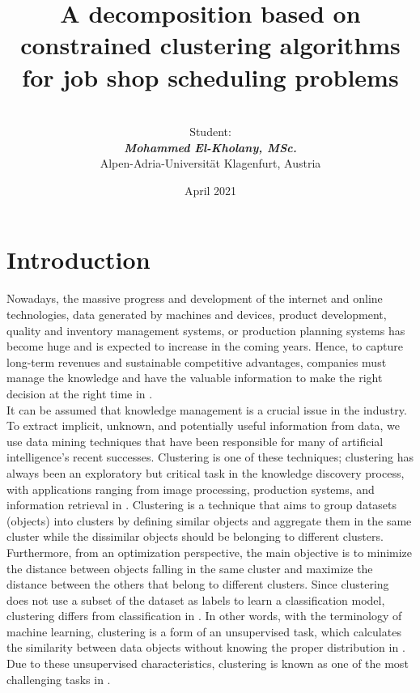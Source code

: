\documentclass{article}
\title{\textbf{A decomposition based on constrained clustering algorithms for job shop scheduling problems} \\}
\author{\\[1in] Student: \\ \textit{\textbf{Mohammed El-Kholany, MSc.}}\\Alpen-Adria-Universität Klagenfurt, Austria \\[3in] }
\date{April 2021}
\begin{document}
\clearpage\maketitle
\thispagestyle{empty}
\clearpage
\setcounter{page}{1}
\newpage
\section{Introduction}
Nowadays, the massive progress and development of the internet and online technologies, data generated by machines and devices, product development, quality and inventory management systems, or production planning systems has become huge and is expected to increase in the coming years. Hence, to capture long-term revenues and sustainable competitive advantages, companies must manage the knowledge and have the valuable information to make the right decision at the right time in \cite{benabdellah2019survey}. \\

It can be assumed that knowledge management is a crucial issue in the industry. To extract implicit, unknown, and potentially useful information from data, we use data mining techniques that have been responsible for many of artificial intelligence’s recent successes. Clustering is one of these techniques; clustering has always been an exploratory but critical task in the knowledge discovery process, with applications ranging from image processing, production systems, and information retrieval in \cite{benabdellah2019survey}. Clustering is a technique that aims to group datasets (objects) into clusters by defining similar objects and aggregate them in the same cluster while the dissimilar objects should be belonging to different clusters. \\

Furthermore, from an optimization perspective, the main objective is to minimize the distance between objects falling in the same cluster and maximize the distance between the others that belong to different clusters. Since clustering does not use a subset of the dataset as labels to learn a classification model, clustering differs from classification in \cite{wagstaff2001constrained}. In other words, with the terminology of machine learning, clustering is a form of an unsupervised task, which calculates the similarity between data objects without knowing the proper distribution in \cite{li2018geometric}. Due to these unsupervised characteristics, clustering is known as one of the most challenging tasks in \cite{benabdellah2019survey}. \\
\end{document}
